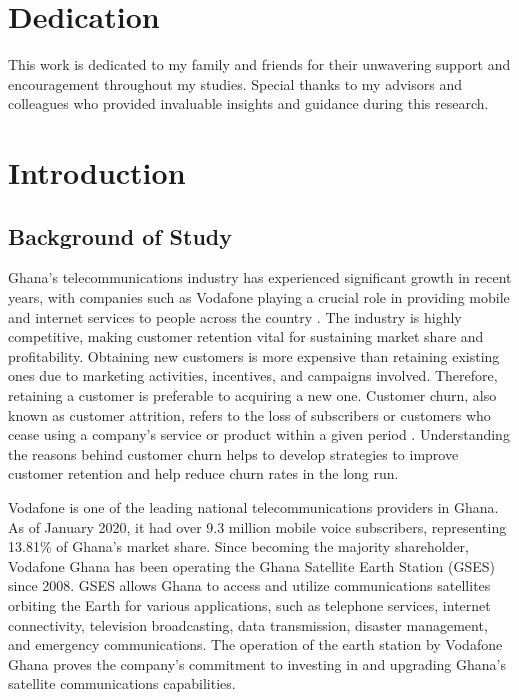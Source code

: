 \documentclass[12pt]{report}
\begin{document}
\newpage
\chapter*{Dedication}
This work is dedicated to my family and friends for their unwavering support and encouragement throughout my studies. Special thanks to my advisors and colleagues who provided invaluable insights and guidance during this research.

\newpage
\tableofcontents

\newpage
\listoffigures

\newpage
\listoftables


\newpage
\chapter{Introduction}

\section{Background of Study}

Ghana's telecommunications industry has experienced significant growth in recent years, with companies such as Vodafone playing a crucial role in providing mobile and internet services to people across the country \cite{bandim2022}. The industry is highly competitive, making customer retention vital for sustaining market share and profitability. Obtaining new customers is more expensive than retaining existing ones due to marketing activities, incentives, and campaigns involved. Therefore, retaining a customer is preferable to acquiring a new one. Customer churn, also known as customer attrition, refers to the loss of subscribers or customers who cease using a company’s service or product within a given period \cite{koranchirath2024}. Understanding the reasons behind customer churn helps to develop strategies to improve customer retention and help reduce churn rates in the long run.

Vodafone is one of the leading national telecommunications providers in Ghana. As of January 2020, it had over 9.3 million mobile voice subscribers, representing 13.81\% of Ghana's market share. Since becoming the majority shareholder, Vodafone Ghana has been operating the Ghana Satellite Earth Station (GSES) since 2008. GSES allows Ghana to access and utilize communications satellites orbiting the Earth for various applications, such as telephone services, internet connectivity, television broadcasting, data transmission, disaster management, and emergency communications. The operation of the earth station by Vodafone Ghana proves the company's commitment to investing in and upgrading Ghana's satellite communications capabilities.
\end{document}
